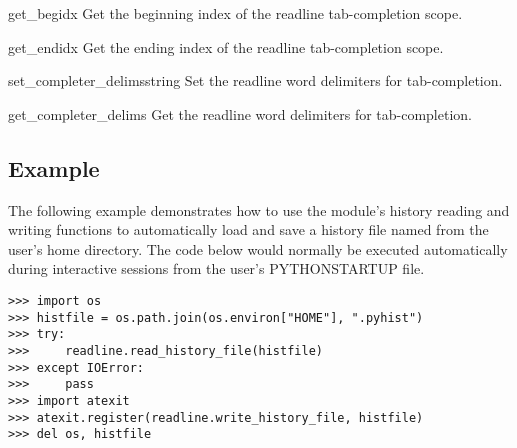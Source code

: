 \begin{funcdesc}{get_begidx}{}
Get the beginning index of the readline tab-completion scope.
\end{funcdesc}

\begin{funcdesc}{get_endidx}{}
Get the ending index of the readline tab-completion scope.
\end{funcdesc}

\begin{funcdesc}{set_completer_delims}{string}
Set the readline word delimiters for tab-completion.
\end{funcdesc}

\begin{funcdesc}{get_completer_delims}{}
Get the readline word delimiters for tab-completion.
\end{funcdesc}

\subsection{Example}

The following example demonstrates how to use the  module's
history reading and writing functions to automatically load and save a
history file named  from the user's home directory.  The code
below would normally be executed automatically during interactive sessions
from the user's PYTHONSTARTUP file.

\begin{verbatim}
>>> import os
>>> histfile = os.path.join(os.environ["HOME"], ".pyhist")
>>> try:
>>>     readline.read_history_file(histfile)
>>> except IOError:
>>>     pass
>>> import atexit
>>> atexit.register(readline.write_history_file, histfile)
>>> del os, histfile
\end{verbatim}

\begin{seealso}
\end{seealso}
